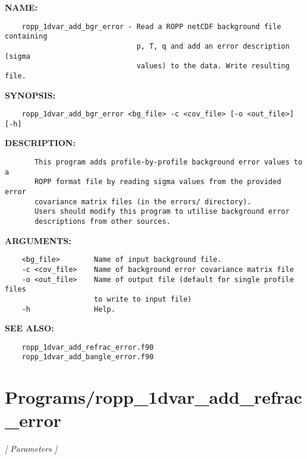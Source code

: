\label{ch:robo43}
\label{ch:Programs_ropp_1dvar_add_bgr_error}
\textbf{NAME:}\hspace{0.08in}\begin{Verbatim}
    ropp_1dvar_add_bgr_error - Read a ROPP netCDF background file containing
                               p, T, q and add an error description (sigma
                               values) to the data. Write resulting file.
\end{Verbatim}
\textbf{SYNOPSIS:}\hspace{0.08in}\begin{Verbatim}
    ropp_1dvar_add_bgr_error <bg_file> -c <cov_file> [-o <out_file>] [-h]
\end{Verbatim}
\textbf{DESCRIPTION:}\hspace{0.08in}\begin{Verbatim}
       This program adds profile-by-profile background error values to a
       ROPP format file by reading sigma values from the provided error
       covariance matrix files (in the errors/ directory).
       Users should modify this program to utilise background error
       descriptions from other sources.
\end{Verbatim}
\textbf{ARGUMENTS:}\hspace{0.08in}\begin{Verbatim}
    <bg_file>        Name of input background file.
    -c <cov_file>    Name of background error covariance matrix file
    -o <out_file>    Name of output file (default for single profile files
                     to write to input file)
    -h               Help.
\end{Verbatim}
\textbf{SEE ALSO:}\hspace{0.08in}\begin{Verbatim}
    ropp_1dvar_add_refrac_error.f90
    ropp_1dvar_add_bangle_error.f90
\end{Verbatim}
\section{Programs/ropp\_1dvar\_add\_refrac\_error}
\textsl{[ Parameters ]}

